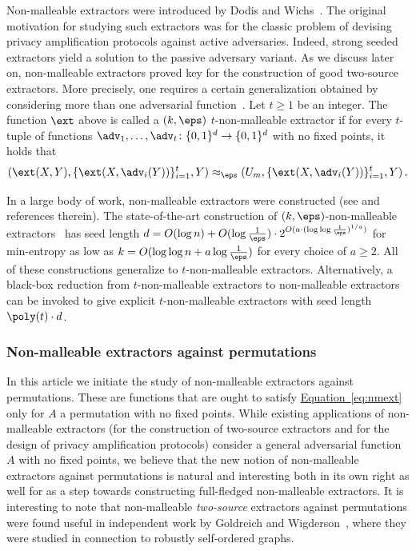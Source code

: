 \documentclass[11pt]{article}
\numberwithin{equation}{section}
\theoremstyle{definition}
\theoremstyle{plain}
\newcommand{\expeqref}[2]{\hyperref[#2]{#1~\eqref{#2}}}
\begin{document}
Non-malleable extractors were introduced by Dodis and Wichs~\cite{DW09}. The original motivation for studying such extractors %
was  %
for the classic problem of devising privacy amplification protocols against active adversaries. Indeed, strong seeded extractors yield a solution to the passive adversary variant. As we discuss later on, non-malleable extractors proved key for the construction of good two-source extractors. More precisely, one requires a certain generalization obtained by considering more than one adversarial function~\cite{CRS12}. Let $t \ge 1$ be an integer. The function $\ext$ above is called a $(k,\eps)$ $t$-non-malleable extractor if for every $t$-tuple of functions $\adv_1,\ldots,\adv_t \colon \{0,1\}^d \to \{0,1\}^d$ with no fixed points, it holds that
\[
(\ext(X,Y),\{\ext(X,\adv_i(Y))\}_{i=1}^{t},Y) \approx_\eps (U_m, \{\ext(X,\adv_i(Y))\}_{i=1}^{t},Y)\,.
\]

In a %
large body of work,
non-malleable extractors were constructed (see \cite{DLWTZ11,CRS12,Li15,Cohen16b,CGL16,Cohen16d,CS16,CL16,Cohen16c,Li17} and references therein). The state-of-the-art construction of $(k,\eps)$-non-malleable extractors~\cite{Li19} has seed length $d = O(\log{n})+ O(\log\frac1{\eps}) \cdot 2^{O(a \cdot (\log\log\frac1{\eps})^{1/a})}$ for min-entropy as low as $k = O(\log\log{n} + a \log\frac1{\eps})$ for every choice of $a \ge 2$. All of these constructions generalize to $t$-non-malleable extractors. Alternatively, a black-box reduction from $t$-non-malleable extractors to non-malleable extractors~\cite{Cohen16d} can be invoked to give explicit $t$-non-malleable extractors with seed length $\poly(t) \cdot d$.

%
%
\subsubsection{Non-malleable extractors against permutations}
%
In this %
article  %
we initiate the study of non-malleable extractors against permutations. These are functions that are ought to satisfy \expeqref{Equation}{eq:nmext} only for  $A$ a permutation with no fixed points. While existing applications of non-malleable extractors (for the construction of %
two-source   %
extractors and for the design of privacy amplification protocols) consider a general adversarial function $A$ with no fixed points, we believe that the new notion of non-malleable extractors against permutations is natural and interesting both in its own right as well for as a step towards constructing full-fledged non-malleable extractors.
It is interesting to note that non-malleable \emph{two-source} extractors against permutations were found useful in
%
independent work  %
by Goldreich and Wigderson~\cite{GW21}, where they
were studied in connection to robustly self-ordered graphs.
\end{document}
